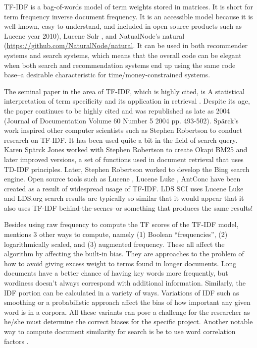 TF-IDF is a bag-of-words model of term weights stored in matrices. It is short for term frequency inverse document frequency.  It is an accessible model because it is well-known, easy to understand, and included in open source products such as Lucene \citep{McCandless:2010:LAS:1893016} year 2010), Lucene Solr \citep{apache_solr_beginners_guide_2013, apache_solr_enterprise_search_server_2015}, and NatualNode’s natural (\url{https://github.com/NaturalNode/natural}.  It can be used in both recommender systems and search systems, which means that the overall code can be elegant when both search and recommendation systems end up using the same code base--a desirable characteristic for time/money-constrained systems.

The seminal paper in the area of TF-IDF, which is highly cited, is A statistical interpretation of term specificity and its application in retrieval \citep{sparck1972statistical}. Despite its age, the paper continues to be highly cited and was republished as late as 2004 (Journal of Documentation Volume 60 Number 5 2004 pp. 493-502). Spärck’s work inspired other computer scientists such as Stephen Robertson to conduct research on TF-IDF. It has been used quite a bit in the field of search query. Karen Spärck Jones worked with Stephen Robertson to create Okapi BM25 and later improved versions, a set of functions used in document retrieval that uses TD-IDF principles. Later, Stephen Robertson worked to develop the Bing search engine. Open source tools such as Lucene \citep{McCandless:2010:LAS:1893016}, Lucene Luke \citep{lucene:luke}, AntConc \citep{anthony_2013} have been created as a result of widespread usage of TF-IDF. LDS SCI uses Lucene Luke and LDS.org search results are typically so similar that it would appear that it also uses TF-IDF behind-the-scenes--or something that produces the same results!

Besides using raw frequency to compute the TF scores of the TF-IDF model, \citet{manning_raghavan_2008_scoring} mentions 3 other ways to compute, namely (1) Boolean ``frequencies'', (2) logarithmically scaled, and (3) augmented frequency. These all affect the algorithm by affecting the built-in bias. They are approaches to the problem of how to avoid giving excess weight to terms found in longer documents. Long documents have a better chance of having key words more frequently, but wordiness doesn’t always correspond with additional information.  Similarly, the IDF portion can be calculated in a variety of ways. Variations of IDF such as smoothing or a probabilistic approach affect the bias of how important any given word is in a corpora. All these variants can pose a challenge for the researcher as he/she must determine the correct biases for the specific project. Another notable way to compute document similarity for search is be to use word correlation factors \citep{won2007using}.

